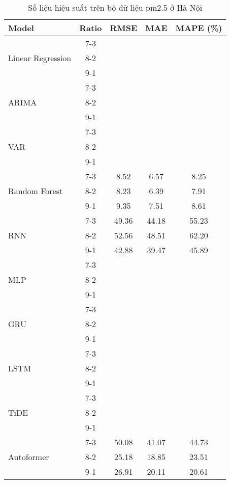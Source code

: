 \begin{table}[h!]
    \centering
    \caption{Số liệu hiệu suất trên bộ dữ liệu pm2.5 ở Hà Nội}
    \begin{tabular}{|l|c|c|c|c|}
    \hline
    \rowcolor{orange!30} \textbf{Model} & \textbf{Ratio} & \textbf{RMSE} & \textbf{MAE} & \textbf{MAPE (\%)} \\ \hline
    \rowcolor{white} & 7-3 &  &  &  \\ 
    \rowcolor{white} Linear Regression & 8-2 &  &  &  \\ 
    \rowcolor{white} & 9-1 &  &  &  \\ \hline
    \rowcolor{white} & 7-3 &  &  &  \\ 
    \rowcolor{white} ARIMA & 8-2 &  &  &  \\ 
    \rowcolor{white} & 9-1 &  &  &  \\ \hline
    \rowcolor{white} & 7-3 &  &  &  \\ 
    \rowcolor{white} VAR & 8-2 &  &  &  \\ 
    \rowcolor{white} & 9-1 &  &  & \\ \hline
    \rowcolor{white} & 7-3 & 8.52 & 6.57 & 8.25 \\ 
    \rowcolor{white} Random Forest & 8-2 & 8.23 & 6.39 & 7.91 \\ 
    \rowcolor{white} & 9-1 & 9.35 & 7.51 & 8.61 \\ \hline
    \rowcolor{white}  & 7-3 & 49.36 & 44.18 & 55.23 \\ 
    \rowcolor{white} RNN & 8-2 & 52.56 & 48.51 & 62.20 \\
    \rowcolor{white}  & 9-1 & 42.88 & 39.47 & 45.89 \\ \hline
    \rowcolor{white} & 7-3 &  &  &  \\ 
    \rowcolor{white} MLP & 8-2 &  &  &  \\ 
    \rowcolor{white} & 9-1 &  &  &  \\ \hline
    \rowcolor{white} & 7-3 &  &  &  \\ 
    \rowcolor{white} GRU & 8-2 &  &  &  \\ 
    \rowcolor{white} & 9-1 &  &  &  \\ \hline
    \rowcolor{white} & 7-3 &  &  &  \\ 
    \rowcolor{white} LSTM & 8-2 &  &  &  \\ 
    \rowcolor{white} & 9-1 &  &  &  \\ \hline
    \rowcolor{white!30} & 7-3 &  &  &  \\ 
    \rowcolor{white!30} TiDE & 8-2 &  &  &  \\ 
    \rowcolor{white!30} & 9-1 &  &  &  \\ \hline
    \rowcolor{white}  & 7-3 & 50.08 & 41.07 & 44.73 \\ 
    \rowcolor{white} Autoformer & 8-2 & 25.18 & 18.85 & 23.51 \\ 
    \rowcolor{white}  & 9-1 & 26.91 & 20.11 & 20.61 \\ \hline

    \end{tabular}
\end{table}